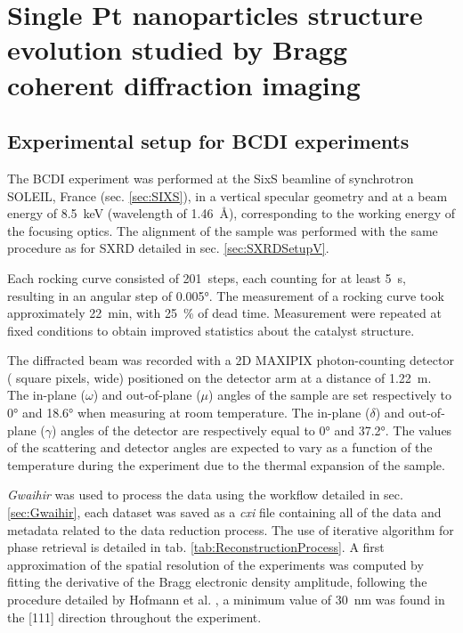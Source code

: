 \section{Single Pt nanoparticles structure evolution studied by Bragg coherent diffraction imaging}\label{sec:BCDINanoparticles}


\subsection{Experimental setup for BCDI experiments}\label{sec:BCDISetup}

The BCDI experiment was performed at the SixS beamline of synchrotron SOLEIL, France (sec. \ref{sec:SIXS}), in a vertical specular geometry and at a beam energy of \qty{8.5}{\keV} (wavelength of \qty{1.46}{\angstrom}), corresponding to the working energy of the focusing optics.
The alignment of the sample was performed with the same procedure as for SXRD detailed in sec. \ref{sec:SXRDSetupV}.

Each rocking curve consisted of \qty{201}{steps}, each counting for at least \qty{5}{\second}, resulting in an angular step of \ang{0.005}.
The measurement of a rocking curve took approximately \qty{22}{\minute}, with \qty{25}{\percent} of dead time.
Measurement were repeated at fixed conditions to obtain improved statistics about the catalyst structure.

The diffracted beam was recorded with a 2D MAXIPIX photon-counting detector ( square pixels,  wide) positioned on the detector arm at a distance of \qty{1.22}{\meter}.
The in-plane ($\omega$) and out-of-plane ($\mu$) angles of the sample are set respectively to \ang{0} and \ang{18.6} when measuring at room temperature.
The in-plane ($\delta$) and out-of-plane ($\gamma$) angles of the detector are respectively equal to \ang{0} and \ang{37.2}.
The values of the scattering and detector angles are expected to vary as a function of the temperature during the experiment due to the thermal expansion of the sample.

\textit{Gwaihir} was used to process the data using the workflow detailed in sec. \ref{sec:Gwaihir}, each dataset was saved as a \textit{cxi} file containing all of the data and metadata related to the data reduction process.
The use of iterative algorithm for phase retrieval is detailed in tab. \ref{tab:ReconstructionProcess}.
A first approximation of the spatial resolution of the experiments was computed by fitting the derivative of the Bragg electronic density amplitude, following the procedure detailed by Hofmann et al. \cite*{Hofmann2020}, a minimum value of \qty{30}{\nm} was found in the [111] direction throughout the experiment.

